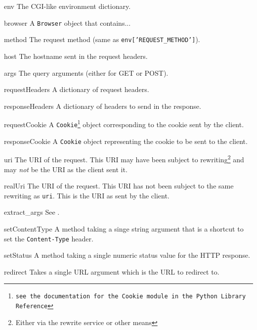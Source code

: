 \documentclass{manual}
\begin{document}
\begin{argdesc}
\item[env] The CGI-like environment dictionary.
\item[browser] A \texttt{Browser} object that contains... %
\item[method] The request method (same as \texttt{env['REQUEST_METHOD']}).
\item[host] The hostname sent in the request headers.
\item[args] The query arguments (either for GET or POST).
\item[requestHeaders] A dictionary of request headers.
\item[responseHeaders] A dictionary of headers to send in the response.
\item[requestCookie] A \texttt{Cookie\footnote{see the documentation
for the \texttt{Cookie} module in the Python Library Reference}}
object corresponding to the cookie sent by the client.
\item[responseCookie] A \texttt{Cookie} object representing the cookie
to be sent to the client.
\item[uri] The URI of the request.  This URI may have been subject to
rewriting\footnote{Either via the rewrite service or other means} and
may \emph{not} be the URI as the client sent it.
\item[realUri] The URI of the request.  This URI has not been subject
to the same rewriting as \texttt{uri}.  This is the URI as sent by the
client.
\item[extract_args] See .
\item[setContentType] A method taking a singe string argument that is
a shortcut to set the \texttt{Content-Type} header.
\item[setStatus] A method taking a single numeric status value for the
HTTP response.
\item[redirect] Takes a single URL argument which is the URL to
redirect to.
\end{argdesc}



\cleardoublepage

\printindex
\end{document}
